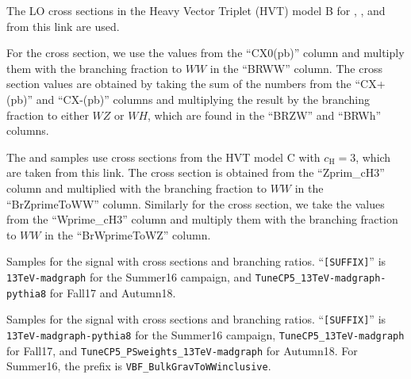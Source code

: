The LO cross sections in the Heavy Vector Triplet (HVT) model B\footnotemark{} for \DY\ZprtoWW, \DY\WprtoWZ, and \DY\WprtoWH from this link\footnotemark{} are used.
\addtocounter{footnote}{-1}
For the \Zpr cross section, we use the values from the ``CX0(pb)'' column and multiply them with the branching fraction to $WW$ in the ``BRWW'' column.
The \Wpr cross section values are obtained by taking the sum of the numbers from the ``CX+(pb)'' and ``CX-(pb)'' columns and multiplying the result by the branching fraction to either $WZ$ or $WH$, which are found in the ``BRZW'' and ``BRWh'' columns.

The \VBF\ZprtoWW and \DY\WprtoWZ samples use cross sections from the HVT model C with $c_\mathrm{H}=3$, which are taken from this link\footnotemark.
The \Zpr cross section is obtained from the ``Zprim\_cH3'' column and multiplied with the branching fraction to $WW$ in the ``BrZprimeToWW'' column.
Similarly for the \Wpr cross section, we take the values from the ``Wprime\_cH3'' column and multiply them with the branching fraction to $WW$ in the ``BrWprimeToWZ'' column.

\begin{table}[htbp]
  \centering
  
  \caption{
    Samples for the \ggF\GBulktoWW signal with cross sections and branching ratios.
    ``\texttt{[SUFFIX]}'' is \texttt{13TeV-madgraph} for the Summer16 campaign, and \texttt{TuneCP5\_13TeV-madgraph-pythia8} for Fall17 and Autumn18.
  }
  \label{tab:ggFGBulkToWWSamples}
\end{table}

\begin{table}[htbp]
  \centering
  
  \caption{
    Samples for the \VBF\GBulktoWW signal with cross sections and branching ratios.
    ``\texttt{[SUFFIX]}'' is \texttt{13TeV-madgraph-pythia8} for the Summer16 campaign, \texttt{TuneCP5\_13TeV-madgraph} for Fall17, and \texttt{TuneCP5\_PSweights\_13TeV-madgraph} for Autumn18.
    For Summer16, the prefix is \texttt{VBF\_BulkGravToWWinclusive}.
  }
  \label{tab:VBFGBulkToWWSamples}
\end{table}

